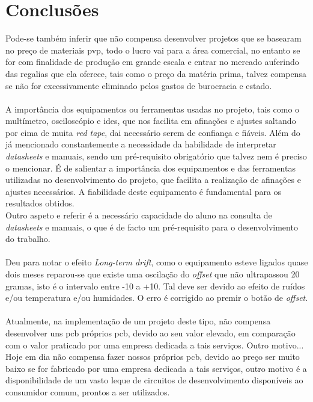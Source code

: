 \chapter{Conclusões}
Pode-se também inferir que não compensa desenvolver projetos que se basearam no preço de materiais \ac{pvp}, todo o lucro vai para a área comercial, no entanto se for com finalidade de produção em grande escala e entrar no mercado auferindo das regalias que ela oferece, tais como o preço da matéria prima, talvez compensa se não for excessivamente eliminado pelos gastos de burocracia e estado.
\\
\\
A importância dos equipamentos ou ferramentas usadas no projeto, tais como o multímetro, osciloscópio e \acsp{ide}, que nos facilita em afinações e ajustes saltando por cima de muita \textit{red tape}, dai necessário serem de confiança e fiáveis. Além do já mencionado constantemente a necessidade da habilidade de interpretar \textit{datasheets} e manuais, sendo um pré-requisito obrigatório que talvez nem é preciso o mencionar.
É de salientar a importância dos equipamentos e das ferramentas utilizadas no desenvolvimento do projeto, que facilita a realização de afinações e ajustes necessários. A fiabilidade deste equipamento é fundamental para os resultados obtidos.
\\
Outro aspeto e referir é a necessário capacidade do aluno na consulta de \textit{datasheets} e manuais, o que é de facto um pré-requisito para o desenvolvimento do trabalho.
\\
\\
Deu para notar o efeito \textit{Long-term drift}, como o equipamento esteve ligados quase dois meses reparou-se que existe uma oscilação do \textit{offset} que não ultrapassou 20 gramas, isto é o intervalo entre -10 a +10. Tal deve ser devido ao efeito de ruídos e/ou temperatura e/ou humidades. O erro é corrigido ao premir o botão de \textit{offset}.
\\
\\
Atualmente, na implementação de um projeto deste tipo, não compensa desenvolver uns \acs{pcb} próprios \acs{pcb}, devido ao seu valor elevado, em comparação com o valor praticado por uma empresa dedicada a tais serviços. Outro motivo...
Hoje em dia não compensa fazer nossos próprios \ac{pcb}, devido ao preço ser muito baixo se for fabricado por uma empresa dedicada a tais serviços, outro motivo é a disponibilidade  de um vasto leque de circuitos de desenvolvimento disponíveis ao consumidor comum, prontos a ser utilizados.
\newpage
